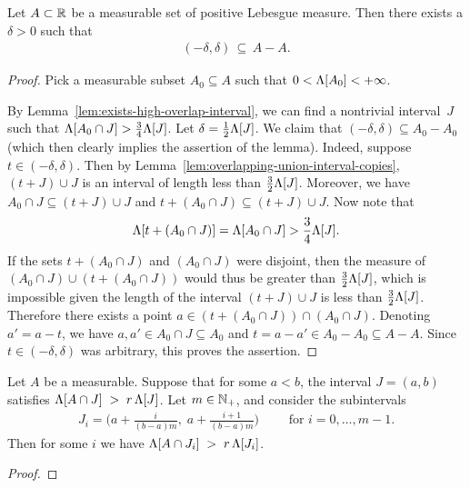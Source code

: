 \begin{lemma}
  \label{lem:difference-set-contains-interval}
  \leanok
  Let $A \subset \mathbb{R}$ be a measurable set of positive Lebesgue measure.
  Then there exists a $\delta > 0$ such that
  \begin{align*}
    (-\delta,\delta) \, \subseteq \, A - A .
  \end{align*}
\end{lemma}
\begin{proof}
  Pick a measurable subset $A_0 \subseteq A$ such that
  $0 < \Lambda[A_0] < +\infty$.

  By Lemma~\ref{lem:exists-high-overlap-interval}, we can find a nontrivial interval~$J$
  such that $\Lambda[A_0 \cap J] > \frac{3}{4} \Lambda[J]$.
  Let $\delta = \frac{1}{2} \Lambda[J]$.
  We claim that $(-\delta,\delta) \subseteq A_0 - A_0$ (which then
  clearly implies the assertion of the lemma).
  Indeed, suppose $t \in (-\delta,\delta)$.
  Then by Lemma~\ref{lem:overlapping-union-interval-copies},
  $(t+J) \cup J$ is an interval of length less than $\frac{3}{2} \Lambda[J]$.
  Moreover, we have $A_0 \cap J \subseteq (t+J) \cup J$ and
  $t+(A_0 \cap J) \subseteq (t+J) \cup J$. Now note that
  \begin{align*}
    \Lambda[t + (A_0 \cap J)] = \Lambda[A_0 \cap J] > \frac{3}{4} \Lambda[J] .
  \end{align*}
  If the sets $t + (A_0 \cap J)$ and $(A_0 \cap J)$ were disjoint, then
  the measure of $(A_0 \cap J) \cup (t+(A_0 \cap J))$ would thus be
  greater than $\frac{3}{2} \Lambda[J]$, which is impossible given the length
  of the interval $(t+J) \cup J$ is less than $\frac{3}{2} \Lambda[J]$.
  Therefore there exists a point $a \in (t + (A_0 \cap J)) \cap (A_0 \cap J)$.
  Denoting $a' = a - t$, we have $a, a' \in A_0 \cap J \subseteq A_0$
  and $t = a - a' \in A_0 - A_0 \subseteq A - A$. Since $t \in (-\delta,\delta)$
  was arbitrary, this proves the assertion.
\end{proof}

\begin{lemma}
  \label{lem:dividing-high-operlap-interval}
  Let $A$ be a measurable. Suppose that for some $a < b$,
  the interval $J = (a,b)$ satisfies
  $\Lambda[A \cap J] \; > \;  r \, \Lambda[J]$. %
  Let $m \in \mathbb{N}_{+}$, and consider the subintervals
  \begin{align*}
    J_i = \Big( a + \frac{i}{(b-a)m} , \; a + \frac{i+1}{(b-a)m} \Big)
    \qquad \text{ for $i = 0, \ldots, m-1$.}
  \end{align*}
  Then for some $i$ we have $\Lambda[A \cap J_i] \; > \;  r \, \Lambda[J_i]$.
\end{lemma}
\begin{proof}
\end{proof}

